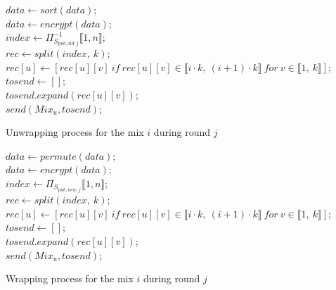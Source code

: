 \documentclass[USenglish,oneside,twocolumn]{article}
\begin{document}
\begin{algorithm}
\DontPrintSemicolon
{}
$data \gets sort(data)$;\\
$data \gets encrypt(data)$;\\

$index \gets {\Pi}^{-1}_{S_{pub,old,j}} \llbracket 1,n \rrbracket$;\\
$rec \gets split(index,\ k)$;\\
{
	$rec[u] \gets [rec[u][v]\ if\ rec[u][v] \in \llbracket i\cdot k,\ (i+1) \cdot k \rrbracket\ for\  v \in \llbracket 1,\ k \rrbracket]$;\\
}
{
	$tosend \gets []$;\\
	{
		$tosend.expand(rec[u][v])$;\\
	}
	$send(Mix_u, tosend)$;\\
}
\caption{Unwrapping process for the mix $i$ during round $j$}
\label{alg:UAS}
\end{algorithm}

\begin{algorithm}
\DontPrintSemicolon
{}
$data \gets permute(data)$;\\
$data \gets encrypt(data)$;\\

$index \gets {\Pi}_{S_{pub,new,j}} \llbracket 1,n \rrbracket$;\\
$rec \gets split(index,\ k)$;\\
{
	$rec[u] \gets [rec[u][v]\ if\ rec[u][v] \in \llbracket i\cdot k,\ (i+1) \cdot k \rrbracket\ for\  v \in \llbracket 1,\ k \rrbracket]$;\\
}
{
	$tosend \gets []$;\\
	{
		$tosend.expand(rec[u][v])$;\\
	}
	$send(Mix_u, tosend)$;\\
}
\caption{Wrapping process for the mix $i$ during round $j$}
\label{alg:WAS}
\end{algorithm}
%
\end{document}
